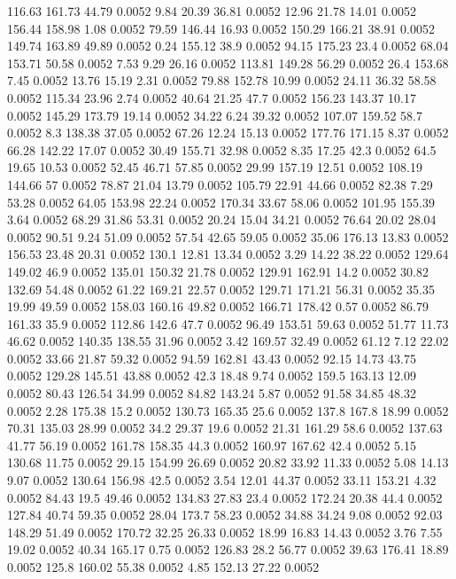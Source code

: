 116.63	161.73	44.79	0.0052
9.84	20.39	36.81	0.0052
12.96	21.78	14.01	0.0052
156.44	158.98	1.08	0.0052
79.59	146.44	16.93	0.0052
150.29	166.21	38.91	0.0052
149.74	163.89	49.89	0.0052
0.24	155.12	38.9	0.0052
94.15	175.23	23.4	0.0052
68.04	153.71	50.58	0.0052
7.53	9.29	26.16	0.0052
113.81	149.28	56.29	0.0052
26.4	153.68	7.45	0.0052
13.76	15.19	2.31	0.0052
79.88	152.78	10.99	0.0052
24.11	36.32	58.58	0.0052
115.34	23.96	2.74	0.0052
40.64	21.25	47.7	0.0052
156.23	143.37	10.17	0.0052
145.29	173.79	19.14	0.0052
34.22	6.24	39.32	0.0052
107.07	159.52	58.7	0.0052
8.3	138.38	37.05	0.0052
67.26	12.24	15.13	0.0052
177.76	171.15	8.37	0.0052
66.28	142.22	17.07	0.0052
30.49	155.71	32.98	0.0052
8.35	17.25	42.3	0.0052
64.5	19.65	10.53	0.0052
52.45	46.71	57.85	0.0052
29.99	157.19	12.51	0.0052
108.19	144.66	57	0.0052
78.87	21.04	13.79	0.0052
105.79	22.91	44.66	0.0052
82.38	7.29	53.28	0.0052
64.05	153.98	22.24	0.0052
170.34	33.67	58.06	0.0052
101.95	155.39	3.64	0.0052
68.29	31.86	53.31	0.0052
20.24	15.04	34.21	0.0052
76.64	20.02	28.04	0.0052
90.51	9.24	51.09	0.0052
57.54	42.65	59.05	0.0052
35.06	176.13	13.83	0.0052
156.53	23.48	20.31	0.0052
130.1	12.81	13.34	0.0052
3.29	14.22	38.22	0.0052
129.64	149.02	46.9	0.0052
135.01	150.32	21.78	0.0052
129.91	162.91	14.2	0.0052
30.82	132.69	54.48	0.0052
61.22	169.21	22.57	0.0052
129.71	171.21	56.31	0.0052
35.35	19.99	49.59	0.0052
158.03	160.16	49.82	0.0052
166.71	178.42	0.57	0.0052
86.79	161.33	35.9	0.0052
112.86	142.6	47.7	0.0052
96.49	153.51	59.63	0.0052
51.77	11.73	46.62	0.0052
140.35	138.55	31.96	0.0052
3.42	169.57	32.49	0.0052
61.12	7.12	22.02	0.0052
33.66	21.87	59.32	0.0052
94.59	162.81	43.43	0.0052
92.15	14.73	43.75	0.0052
129.28	145.51	43.88	0.0052
42.3	18.48	9.74	0.0052
159.5	163.13	12.09	0.0052
80.43	126.54	34.99	0.0052
84.82	143.24	5.87	0.0052
91.58	34.85	48.32	0.0052
2.28	175.38	15.2	0.0052
130.73	165.35	25.6	0.0052
137.8	167.8	18.99	0.0052
70.31	135.03	28.99	0.0052
34.2	29.37	19.6	0.0052
21.31	161.29	58.6	0.0052
137.63	41.77	56.19	0.0052
161.78	158.35	44.3	0.0052
160.97	167.62	42.4	0.0052
5.15	130.68	11.75	0.0052
29.15	154.99	26.69	0.0052
20.82	33.92	11.33	0.0052
5.08	14.13	9.07	0.0052
130.64	156.98	42.5	0.0052
3.54	12.01	44.37	0.0052
33.11	153.21	4.32	0.0052
84.43	19.5	49.46	0.0052
134.83	27.83	23.4	0.0052
172.24	20.38	44.4	0.0052
127.84	40.74	59.35	0.0052
28.04	173.7	58.23	0.0052
34.88	34.24	9.08	0.0052
92.03	148.29	51.49	0.0052
170.72	32.25	26.33	0.0052
18.99	16.83	14.43	0.0052
3.76	7.55	19.02	0.0052
40.34	165.17	0.75	0.0052
126.83	28.2	56.77	0.0052
39.63	176.41	18.89	0.0052
125.8	160.02	55.38	0.0052
4.85	152.13	27.22	0.0052
